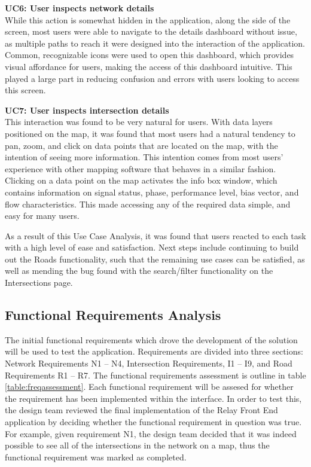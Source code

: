 \documentclass{report}
\begin{document}
\noindent \textbf{UC6: User inspects network details} \\
While this action is somewhat hidden in the application, along the side of the screen, most users were able to navigate to the details dashboard without issue, as multiple paths to reach it were designed into the interaction of the application.
Common, recognizable icons were used to open this dashboard, which provides visual affordance for users, making the access of this dashboard intuitive.
This played a large part in reducing confusion and errors with users looking to access this screen.

\noindent \textbf{UC7: User inspects intersection details} \\
This interaction was found to be very natural for users.
With data layers positioned on the map, it was found that most users had a natural tendency to pan, zoom, and click on data points that are located on the map, with the intention of seeing more information.
This intention comes from most users' experience with other mapping software that behaves in a similar fashion.
Clicking on a data point on the map activates the info box window, which contains information on signal status, phase, performance level, bias vector, and flow characteristics.
This made accessing any of the required data simple, and easy for many users.

As a result of this Use Case Analysis, it was found that users reacted to each task with a high level of ease and satisfaction.
Next steps include continuing to build out the Roads functionality, such that the remaining use cases can be satisfied, as well as mending the bug found with the search/filter functionality on the Intersections page.

\subsection{Functional Requirements Analysis}

The initial functional requirements which drove the development of the solution will be used to test the application. Requirements are divided into three sections: Network Requirements N1 -- N4, Intersection Requirements, I1 -- I9, and Road Requirements R1 -- R7. The functional requirements assessment is outline in table \ref{table:freqassessment}. Each functional requirement will be assesed for whether the requirement has been implemented within the interface. In order to test this, the design team reviewed the final implementation of the Relay Front End application by deciding whether the functional requirement in question was true. For example, given requirement N1, the design team decided that it was indeed possible to see all of the intersections in the network on a map, thus the functional requirement was marked as completed.
\end{document}
